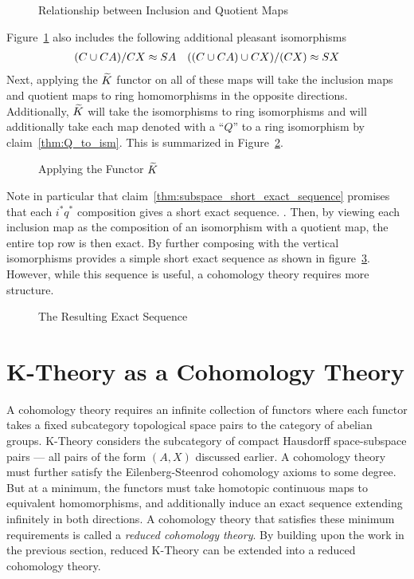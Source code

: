 \documentclass[../sean_thesis.tex]{subfiles}
\begin{document}
\begin{figure}[ht!]
	
	\caption{Relationship between Inclusion and Quotient Maps}
	\label{fig:long_exact_argument}
\end{figure}

Figure~\ref{fig:long_exact_argument} also includes the following additional pleasant isomorphisms 
\begin{align*}
	(C \cup CA)/CX \approx SA && 
	((C \cup CA) \cup CX)/(CX) \approx SX
\end{align*}
Next, applying the $\widetilde{K}$ functor on all of these maps will take the inclusion maps and quotient maps to ring homomorphisms in the opposite directions. Additionally, $\widetilde{K}$ will take the isomorphisms to ring isomorphisms and will additionally take each map denoted with a ``$Q$'' to a ring isomorphism by claim~\ref{thm:Q_to_ism}. This is summarized in Figure~\ref{fig:kr_to_long_exact}.
\begin{figure}[ht!]
	
	\caption{Applying the Functor $\widetilde{K}$}
	\label{fig:kr_to_long_exact}
\end{figure}
Note in particular that claim~\ref{thm:subspace_short_exact_sequence} promises that each $i^{*}q^{*}$ composition gives a short exact sequence. . Then, by viewing each inclusion map as the composition of an isomorphism with a quotient map, the entire top row is then exact. By further composing with the vertical isomorphisms provides a simple short exact sequence as shown in figure~\ref{fig:nice_long_sequence}. However, while this sequence is useful, a cohomology theory requires more structure.
\begin{figure}[ht!]
	
	\caption{The Resulting Exact Sequence}
	\label{fig:nice_long_sequence}
\end{figure}

\section{K-Theory as a Cohomology Theory}

A cohomology theory requires an infinite collection of functors where each functor takes a fixed subcategory  topological space pairs to the category of abelian groups. K-Theory considers the subcategory of compact Hausdorff space-subspace pairs --- all pairs of the form $(A,X)$ discussed earlier. A cohomology theory must further satisfy the Eilenberg-Steenrod cohomology axioms to some degree. But at a minimum, the functors must take homotopic continuous maps to equivalent homomorphisms, and additionally induce an exact sequence extending infinitely in both directions. A cohomology theory that satisfies these minimum requirements is called a \emph{reduced cohomology theory}. By building upon the work in the previous section, reduced K-Theory can be extended into a reduced cohomology theory.
\end{document}
